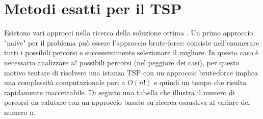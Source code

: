 \documentclass[a4paper,12pt]{report}
\begin{document}
\section{Metodi esatti per il TSP}
Esistono vari approcci nella ricerca della soluzione ottima \cite{Analysis of Brute Force}. Un primo approccio "naive" per il problema può essere l'approccio brute-force: consiste nell'enumerare tutti i possibili percorsi e successivamente selezionare il migliore. In questo caso è necessario analizzare $n!$ possibili percorsi (nel peggiore dei casi), per questo motivo tentare di risolvere una istanza TSP con un approccio brute-force implica una complessità computazionale pari a $O(n!)$ e quindi un tempo che risulta rapidamente inaccettabile. Di seguito una tabella che illustra il numero di percorsi da valutare con un approccio basato su ricerca esaustiva al variare del numero n.
\end{document}
